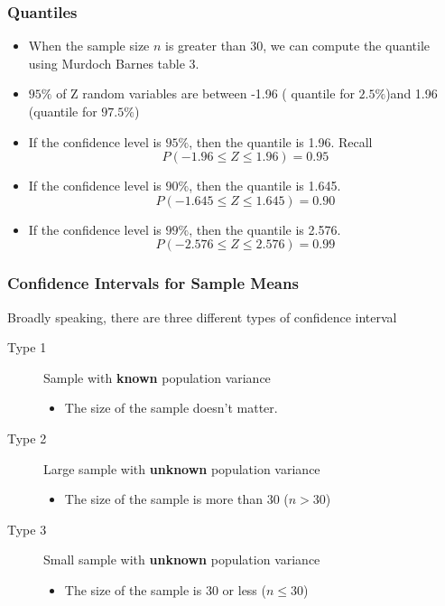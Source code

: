 \begin{frame}
\frametitle{Quantiles}

\begin{itemize} \item When the sample size $n$ is greater than 30, we can compute the quantile using Murdoch Barnes table 3.

\item $95\%$ of Z random variables are between -1.96 ( quantile for $2.5\%$)and 1.96 (quantile for $97.5\%$)
\end{itemize}

\begin{itemize}
\item If the confidence level is $95\%$, then the quantile is 1.96. Recall
\[ P( -1.96 \leq Z \leq 1.96) = 0.95 \]

\item If the confidence level is $90\%$, then the quantile is 1.645.
\[ P( -1.645 \leq Z \leq 1.645) = 0.90 \]

\item If the confidence level is $99\%$, then the quantile is 2.576.
\[ P( -2.576 \leq Z \leq 2.576) = 0.99 \]

\end{itemize}



\end{frame}
\begin{frame}
\frametitle{Confidence Intervals for Sample Means}
Broadly speaking, there are three different types of confidence interval
\begin{description}
\item[Type 1] Sample with \textbf{known} population variance
\begin{itemize}
\item The size of the sample doesn't matter.
\end{itemize}
\item[Type 2] Large sample with \textbf{unknown} population variance
\begin{itemize}
\item The size of the sample is more than 30 ($n > 30$)
\end{itemize}
\item[Type 3] Small sample with \textbf{unknown} population variance
\begin{itemize}
\item The size of the sample is 30 or less ($n\leq 30$)
\end{itemize}
\end{description}
\end{frame}

